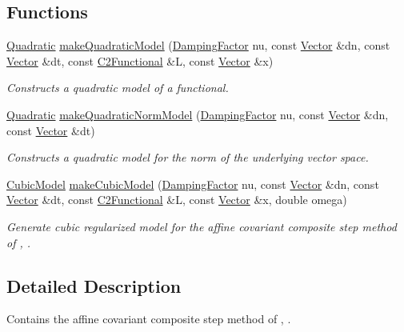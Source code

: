\subsection*{Functions}
\begin{DoxyCompactItemize}
\item 
\hyperlink{classSpacy_1_1Quadratic}{Quadratic} \hyperlink{namespaceSpacy_1_1CompositeStep_a0366dfcec4d1f3f5f304eddce82bc58d}{make\+Quadratic\+Model} (\hyperlink{classSpacy_1_1DampingFactor}{Damping\+Factor} nu, const \hyperlink{classSpacy_1_1Vector}{Vector} \&dn, const \hyperlink{classSpacy_1_1Vector}{Vector} \&dt, const \hyperlink{classSpacy_1_1C2Functional}{C2\+Functional} \&L, const \hyperlink{classSpacy_1_1Vector}{Vector} \&x)
\begin{DoxyCompactList}\small\item\em Constructs a quadratic model of a functional. \end{DoxyCompactList}\item 
\hyperlink{classSpacy_1_1Quadratic}{Quadratic} \hyperlink{namespaceSpacy_1_1CompositeStep_ad7e8e9200b3ebfa44c75b79d08cd7db9}{make\+Quadratic\+Norm\+Model} (\hyperlink{classSpacy_1_1DampingFactor}{Damping\+Factor} nu, const \hyperlink{classSpacy_1_1Vector}{Vector} \&dn, const \hyperlink{classSpacy_1_1Vector}{Vector} \&dt)
\begin{DoxyCompactList}\small\item\em Constructs a quadratic model for the norm of the underlying vector space. \end{DoxyCompactList}\item 
\hyperlink{classSpacy_1_1CompositeStep_1_1CubicModel}{Cubic\+Model} \hyperlink{namespaceSpacy_1_1CompositeStep_ab7a53f016abbcc75876b77c3edc3ec23}{make\+Cubic\+Model} (\hyperlink{classSpacy_1_1DampingFactor}{Damping\+Factor} nu, const \hyperlink{classSpacy_1_1Vector}{Vector} \&dn, const \hyperlink{classSpacy_1_1Vector}{Vector} \&dt, const \hyperlink{classSpacy_1_1C2Functional}{C2\+Functional} \&L, const \hyperlink{classSpacy_1_1Vector}{Vector} \&x, double omega)
\begin{DoxyCompactList}\small\item\em Generate cubic regularized model for the affine covariant composite step method of \cite{Lubkoll2015}, \cite{Lubkoll2015a}. \end{DoxyCompactList}\end{DoxyCompactItemize}


\subsection{Detailed Description}
Contains the affine covariant composite step method of \cite{Lubkoll2015}, \cite{Lubkoll2015a}. 

